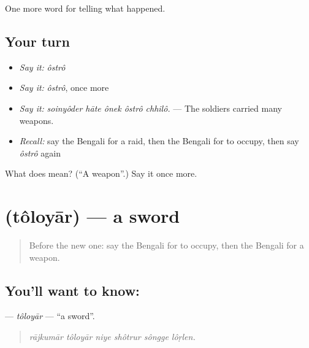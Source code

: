 \begin{grammarlens}[title={What you've built}]
One more word for telling what happened.
\end{grammarlens}

\subsection*{Your turn}
\begin{itemize}
\raggedright
  \item \emph{Say it:} \emph{ôstrô}
  \item \emph{Say it:} \emph{ôstrô}, once more
  \item \emph{Say it:} \emph{soinyôder hāte ônek ôstrô chhilô.} — The soldiers carried many weapons.
  \item \emph{Recall:} say the Bengali for a raid, then the Bengali for to occupy, then say \emph{ôstrô} again
\end{itemize}

\begin{tcolorbox}[breakable,colback=teal!4,colframe=teal!35!black,title={Before you move on}]
What does  mean? (\textquotedblleft{}A weapon\textquotedblright{}.) Say it once more.
\end{tcolorbox}
\section[\texorpdfstring{\bn{তলোয়ার} (tôloyār)}{তলোয়ার (tôloyār)}]{ (tôloyār) — a sword}

\label{lesson:BN-C315-toloyar}



\begin{quote}
Before the new one: say the Bengali for to occupy, then the Bengali for a weapon.
\end{quote}

\subsection*{You'll want to know: }
\textbf{} — \emph{tôloyār} — \textquotedblleft{}a sword\textquotedblright{}.

\begin{quote}
     
\end{quote}

\begin{quote}
\emph{rājkumār tôloyār niye shôtrur sôngge lôṛlen.}
\end{quote}


